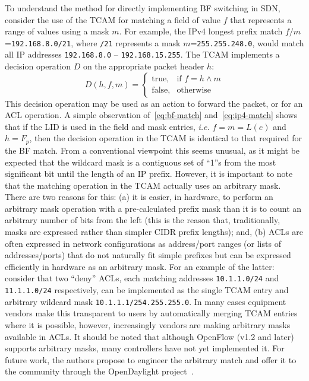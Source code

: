 \documentclass[conference]{IEEEtran}
\begin{document}
To understand the method for directly implementing BF switching in SDN, consider the use of the TCAM for matching a field of value $f$ that represents a range of values using a mask $m$. For example, the IPv4 longest prefix match $f/m$=\texttt{192.168.8.0/21}, where \texttt{/21} represents a mask $m$=\texttt{255.255.248.0}, would match all IP addresses \texttt{192.168.8.0} -- \texttt{192.168.15.255}. The TCAM implements a decision operation $D$ on the appropriate packet header $h$:
\begin{equation}
  \label{eq:ip4-match}
  D(h,f,m)= \left\{
  \begin{array}{ll}
    \text{true}, & \text{if }  f = h \wedge m \\
    \text{false}, & \text{otherwise}
  \end{array}
  \right.
\end{equation}
This decision operation may be used as an action to forward the packet, or for an ACL operation. A simple observation of~\eqref{eq:bf-match} and~\eqref{eq:ip4-match} shows that if the LID is used in the field and mask entries, \emph{i.e.} $f=m=L(e)$ and $h=F_p$, then the decision operation in the TCAM is identical to that required for the BF match. From a conventional viewpoint this seems unusual, as it might be expected that the wildcard mask is a contiguous set of ``1''s from the most significant bit until the length of an IP prefix. However, it is important to note that the matching operation in the TCAM actually uses an arbitrary mask. There are two reasons for this: (a) it is easier, in hardware, to perform an arbitrary mask operation with a pre-calculated prefix mask than it is to count an arbitrary number of bits from the left (this is the reason that, traditionally, masks are expressed rather than simpler CIDR prefix lengths); and, (b) ACLs are often expressed in network configurations as address/port ranges (or lists of addresses/ports) that do not naturally fit simple prefixes but can be expressed efficiently in hardware as an arbitrary mask. For an example of the latter: consider that two ``deny'' ACLs, each matching addresses \texttt{10.1.1.0/24} and \texttt{11.1.1.0/24} respectively, can be implemented as the single TCAM entry and arbitrary wildcard mask \texttt{10.1.1.1/254.255.255.0}. In many cases equipment vendors make this transparent to users by automatically merging TCAM entries where it is possible, however, increasingly vendors are making arbitrary masks available in ACLs. It should be noted that although OpenFlow (v1.2 and later) supports arbitrary masks, many controllers have not yet implemented it. For future work, the authors propose to engineer the arbitrary match and offer it to the community through the OpenDaylight project~\cite{OpenDaylight}.
\end{document}

